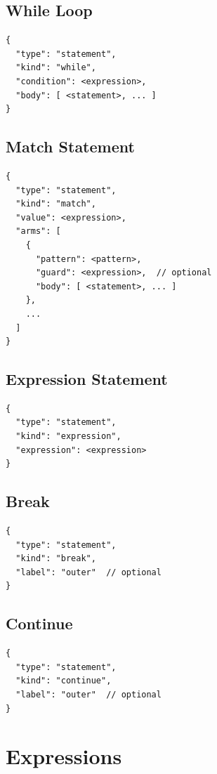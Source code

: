 \subsection{While Loop}

\begin{lstlisting}[language={}]
{
  "type": "statement",
  "kind": "while",
  "condition": <expression>,
  "body": [ <statement>, ... ]
}
\end{lstlisting}

\subsection{Match Statement}

\begin{lstlisting}[language={}]
{
  "type": "statement",
  "kind": "match",
  "value": <expression>,
  "arms": [
    {
      "pattern": <pattern>,
      "guard": <expression>,  // optional
      "body": [ <statement>, ... ]
    },
    ...
  ]
}
\end{lstlisting}

\subsection{Expression Statement}

\begin{lstlisting}[language={}]
{
  "type": "statement",
  "kind": "expression",
  "expression": <expression>
}
\end{lstlisting}

\subsection{Break}

\begin{lstlisting}[language={}]
{
  "type": "statement",
  "kind": "break",
  "label": "outer"  // optional
}
\end{lstlisting}

\subsection{Continue}

\begin{lstlisting}[language={}]
{
  "type": "statement",
  "kind": "continue",
  "label": "outer"  // optional
}
\end{lstlisting}

\section{Expressions}


